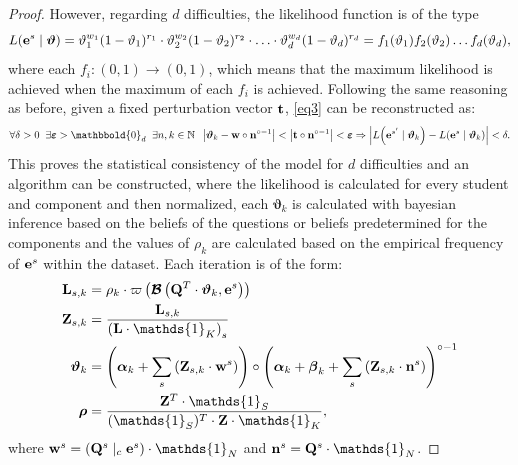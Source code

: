 \documentclass{article}
\newcommand{\0}{\mathbbold{0}}
\newcommand{\1}{\mathds{1}}
\newcommand{\Lh}[2]{L\!\left(#1 \mid #2\right)}
\begin{document}
\begin{proof}
    However, regarding $d$ difficulties, the likelihood function is of the type
    $$ \Lh{{\bf e}^s}{\boldsymbol \vartheta} = \vartheta_1^{w_1}(1-\vartheta_1)^{r_1} \cdot \vartheta_2^{w_2}(1-\vartheta_2)^{r_2} \cdot \hdots \cdot \vartheta_d^{w_d}(1-\vartheta_d)^{r_d} = f_1(\vartheta_1)f_2(\vartheta_2)\dots f_d(\vartheta_d), $$
    where each $f_i: (0,1) \rightarrow (0,1)$, which means that the maximum likelihood is achieved when the maximum of each $f_i$ is achieved.
    Following the same reasoning as before, given a fixed perturbation vector ${\bf t}$, \eqref{eq3} can be reconstructed as:
    \begin{equation}
        \forall \delta > 0 \;\; \exists \boldsymbol{\varepsilon} > \0_d \;\; \exists n,k \in \mathbb{N} \;\; \left| \boldsymbol{\vartheta}_k - {\bf w} \circ {\bf n}^{\circ-1} \right| < \left| {\bf t} \circ {\bf n}^{\circ-1} \right| < \boldsymbol{\varepsilon} \Rightarrow \left| \Lh{{\bf e}^{s'}}{\boldsymbol{\vartheta}_k} - \Lh{{\bf e}^{s}}{\boldsymbol{\vartheta}_k} \right| < \delta. \label{eq4}
    \end{equation}
    This proves the statistical consistency of the model for $d$ difficulties and an algorithm can be constructed, where the likelihood is calculated for every student and component and then normalized, each $\boldsymbol{\vartheta}_k$ is calculated with bayesian inference based on the beliefs of the questions or beliefs predetermined for the components and the values of $\rho_k$ are calculated based on the empirical frequency of ${\bf e}^s$ within the dataset.
    Each iteration is of the form:
    \begin{align}\begin{split}\label{alg1}
        {\bf L}_{s,k} &= \rho_k \cdot \varpi\left(\boldsymbol{\mathcal{B}}\left({\bf Q}^T \cdot \boldsymbol{\vartheta}_k, {\bf e}^s\right)\right) \\
        {\bf Z}_{s,k} &= \frac{{\bf L}_{s,k}}{\left({\bf L} \cdot \1_K\right)_s} \\
        \boldsymbol{\vartheta}_k &= \left( \boldsymbol{\alpha}_k + \sum_s \left({\bf Z}_{s,k} \cdot {\bf w}^s\right) \right) \circ \left( \boldsymbol{\alpha}_k + \boldsymbol{\beta}_k + \sum_s\left({\bf Z}_{s,k} \cdot {\bf n}^s\right) \right)^{\circ-1} \\
        \boldsymbol{\rho} &= \frac{{\bf Z}^T \cdot \1_S}{(\1_S)^T \cdot {\bf Z} \cdot \1_K},
    \end{split}\end{align}
    where ${\bf w}^s = \left({\bf Q}^s \mid_c {\bf e}^s \right) \cdot \1_N$ and ${\bf n}^s = {\bf Q}^s \cdot \1_N$.
\end{proof}
\end{document}
